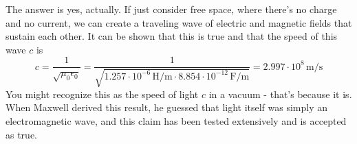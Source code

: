 The answer is yes, actually. If just consider free space, where there's no charge and no current, we can create a traveling wave of electric and magnetic fields that sustain each other. It can be shown that this is true and that the speed of this wave $c$ is
\[
	c = \frac{1}{\sqrt{\mu_0\epsilon_0}} = \frac{1}{\sqrt{1.257 \cdot 10^{-6} \, \text{H/m} \cdot 8.854 \cdot 10^{-12} \, \text{F/m}}} = 2.997 \cdot 10^{8} \, \text{m/s}
\]
You might recognize this as the speed of light $c$ in a vacuum - that's because it is. When Maxwell derived this result, he guessed that light itself was simply an electromagnetic wave, and this claim has been tested extensively and is accepted as true. \\